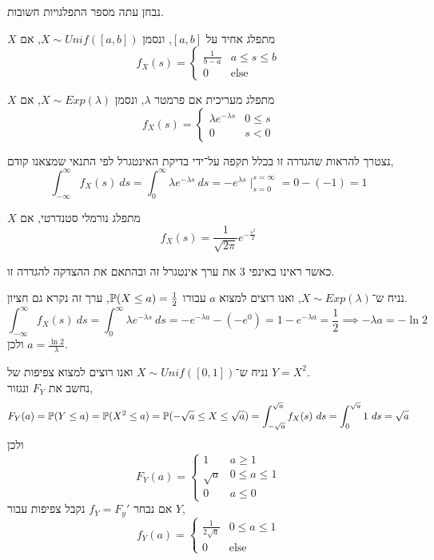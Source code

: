 נבחן עתה מספר התפלגויות חשובות.
\begin{definition}
	$X$ מתפלג אחיד על $[a, b]$, ונסמן $X \sim Unif([a, b])$, אם
	\[
		f_X(s) = \begin{cases}
			\frac{1}{b - a} & a \le s \le b \\
			0 & \text{else}
		\end{cases}
	\]
\end{definition}
\begin{definition}
	$X$ מתפלג מעריכית אם פרמטר $\lambda$, ונסמן $X \sim Exp(\lambda)$, אם
	\[
		f_X(s) = \begin{cases}
			\lambda e^{-\lambda s} & 0 \le s \\
			0 & s < 0
		\end{cases}
	\]
\end{definition}
נצטרך להראות שהגדרה זו בכלל תקפה על־ידי בדיקת האינטגרל לפי התנאי שמצאנו קודם,
\[
	\int_{-\infty}^\infty f_X(s)\ ds
	= \int_0^\infty \lambda e^{-\lambda s}\ ds
	= -e^{\lambda s} \mid_{s = 0}^{s = \infty}
	= 0 - (-1)
	= 1
\]
\begin{definition}\label{standard_normal_distribution}
	$X$ מתפלג נורמלי סטנדרטי, אם
	\[
		f_X(s) = \frac{1}{\sqrt{2 \pi}} e^{-\frac{s^2}{2}}
	\]
\end{definition}
כאשר ראינו באינפי 3 את ערך אינטגרל זה ובהתאם את ההצדקה להגדרה זו.
\begin{example}
	נניח ש־$X \sim Exp(\lambda)$, ואנו רוצים למצוא $a$ עבורו $\mathbb{P}(X \le a) = \frac{1}{2}$, ערך זה נקרא גם חציון.
	\[
		\int_{-\infty}^{\infty} f_X(s)\ ds
		= \int_{0}^{\infty} \lambda e^{-\lambda s}\ ds
		= -e^{-\lambda a} - (-e^0)
		= 1 - e^{-\lambda a}
		= \frac{1}{2}
		\implies -\lambda a = - \ln 2
	\]
	ולכן $a = \frac{\ln 2}{\lambda}$.
\end{example}
\begin{example}
	נניח ש־$X \sim Unif([0, 1])$ ואנו רוצים למצוא צפיפות של $Y = X^2$. \\
	נחשב את $F_Y$ ונגזור,
	\[
		F_Y(a)
		= \mathbb{P}(Y \le a)
		= \mathbb{P}(X^2 \le a)
		= \mathbb{P}(-\sqrt{a} \le X \le \sqrt{a})
		= \int_{-\sqrt{a}}^{\sqrt{a}} f_X(s)\ ds
		= \int_0^{\sqrt{a}} 1\ ds
		= \sqrt{a}
	\]
	ולכן
	\[
		F_Y(a) = \begin{cases}
			1 & a \ge 1 \\
			\sqrt{a} & 0 \le a \le 1 \\
			0 & a \le 0
		\end{cases}
	\]
	אם נבחר $f_Y = F_y'$ נקבל צפיפות עבור $Y$,
	\[
		f_Y(a)
		= \begin{cases}
			\frac{1}{2 \sqrt{a}} & 0 \le a \le 1 \\
			0 & \text{else}
		\end{cases}
	\]
\end{example}

